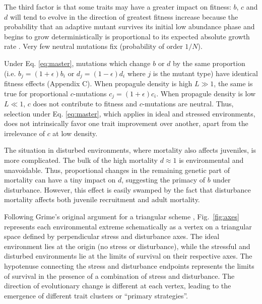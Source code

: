 \documentclass[11pt]{article}
\begin{document}
The third factor is that some traits may have a greater impact on fitness: $b$, $c$ and $d$ will tend to evolve in the direction of greatest fitness increase because the probability that an adaptive mutant survives its initial low abundance phase and begins to grow deterministically is proportional to its expected absolute growth rate \citep{haldane_1927,uecker_2011}. Very few neutral mutations fix (probability of order $1/N$). 

Under Eq. \eqref{eq:master}, mutations which change $b$ or $d$ by the same  proportion (i.e. $b_j=(1+\epsilon) b_i$ or $d_j=(1-\epsilon) d_i$ where $j$ is the mutant type) have identical fitness effects (Appendix C). When propagule density is high  $L\gg 1$, the same is true for proportional $c$-mutations $c_j=(1+\epsilon) c_i$. When propagule density is low $L\ll 1$, $c$ does not contribute to fitness and $c$-mutations are neutral. Thus, selection under Eq. \eqref{eq:master}, which applies in ideal and stressed environments, does not intrinsically favor one trait improvement over another, apart from the irrelevance of $c$ at low density. 

The situation in disturbed environments, where mortality also affects juveniles, is more complicated. The bulk of the high mortality $d\approx 1$ is environmental and unavoidable. Thus, proportional changes in the remaining genetic part of mortality can have a tiny impact on $d$, suggesting the primacy of $b$ under disturbance. However, this effect is easily swamped by the fact that disturbance mortality affects both juvenile recruitment and adult mortality. 

Following Grime's original argument for a triangular scheme \citep{grime_1977}, Fig.~\ref{fig:axes} represents each environmental extreme schematically as a vertex on a triangular space defined by perpendicular stress and disturbance axes. The ideal environment lies at the origin (no stress or disturbance), while the stressful and disturbed environments lie at the limits of survival on their respective axes. The hypotenuse connecting the stress and disturbance endpoints represents the limits of survival in the presence of a combination of stress and disturbance. The direction of evolutionary change is different at each vertex, leading to the emergence of different trait clusters or ``primary strategies''. 
\end{document}
